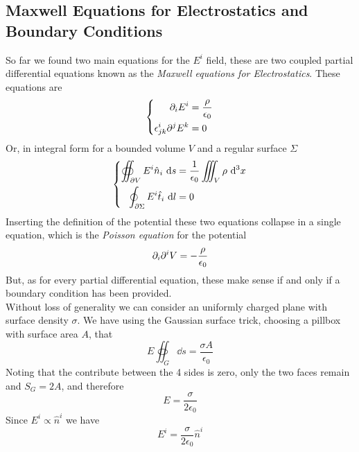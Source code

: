 \documentclass[../electromagnetism]{subfiles}
\begin{document}
\subsection{Maxwell Equations for Electrostatics and Boundary Conditions}
So far we found two main equations for the $E^i$ field, these are two coupled partial differential equations known as the \textit{Maxwell equations for Electrostatics}. These equations are
\begin{equation}
	\left\{ \begin{aligned}
			\partial_iE^i&=\frac{\rho}{\epsilon_0}\\
			\epsilon^i_{jk}\partial^jE^k&=0
	\end{aligned}\right.
	\label{eq:maxwes}
\end{equation}
Or, in integral form for a bounded volume $V$ and a regular surface $\Sigma$
\begin{equation}
	\left\{ \begin{aligned}
			\oiint_{\partial V}E^i\hat{n}_i\ \mathrm{d} s&=\frac{1}{\epsilon_0}\iiint_V\rho\ \mathrm{d}^3x\\
			\oint_{\partial\Sigma} E^i\hat{t}_i\ \mathrm{d} l&=0
	\end{aligned}\right.
	\label{eq:maxwesint}
\end{equation}
Inserting the definition of the potential these two equations collapse in a single equation, which is the \textit{Poisson equation} for the potential
\begin{equation}
	\partial_i\partial^iV=-\frac{\rho}{\epsilon_0}
	\label{eq:poissoneq}
\end{equation}
But, as for every partial differential equation, these make sense if and only if a boundary condition has been provided.\\
Without loss of generality we can consider an uniformly charged plane with surface density $\sigma$. We have using the Gaussian surface trick, choosing a pillbox with surface area $A$, that
\begin{equation*}
	E\oiint_G\dd s=\frac{\sigma A}{\epsilon_0}
\end{equation*}
Noting that the contribute between the 4 sides is zero, only the two faces remain and $S_G=2A$, and therefore
\begin{equation}
	E=\frac{\sigma}{2\epsilon_0}
	\label{eq:efieldplane}
\end{equation}
Since $E^i\propto\hat{n}^i$ we have
\begin{equation}
	E^i=\frac{\sigma}{2\epsilon_0}\hat{n}^i
	\label{eq:efieldplanevec}
\end{equation}
\end{document}
